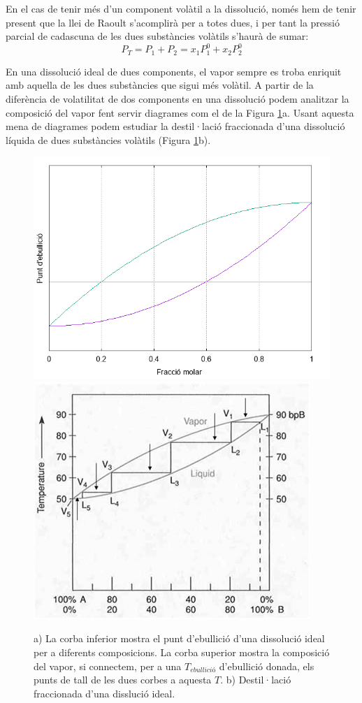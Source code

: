 En el cas de tenir més d'un component volàtil a la dissolució, només hem de tenir present que la llei de Raoult s'acomplirà per a totes dues, i per tant la pressió parcial de cadascuna de les dues substàncies volàtils s'haurà de sumar:
\[
P_T=P_1+P_2=x_1P_1^0+x_2P_2^0
\]

En una dissolució ideal de dues components, el vapor sempre es troba enriquit amb aquella de les dues substàncies que sigui més volàtil.
A partir de la diferència de volatilitat de dos components en una dissolució podem analitzar la composició del vapor fent servir diagrames com el de la Figura \ref{fig:PhaseDiagram}a.
Usant aquesta mena de diagrames podem estudiar la destil·lació fraccionada d'una dissolució líquida de dues substàncies volàtils (Figura \ref{fig:PhaseDiagram}b).

\begin{figure}[h]
\centering
\includegraphics[scale=0.5]{figures/PhaseDiagram.png}
\includegraphics[scale=0.5]{figures/FractionalDistillation.png}
\caption[Diagrama de fases i destil·lació fraccionada d'una dissolució ideal]{a) La corba inferior mostra el punt d'ebullició d'una dissolució ideal per a diferents composicions. La corba superior mostra la composició del vapor, si connectem, per a una $T_{ebullició}$ d'ebullició donada, els punts de tall de les dues corbes a aquesta $T$. b) Destil·lació fraccionada d'una disslució ideal.}
\label{fig:PhaseDiagram}
\end{figure}

